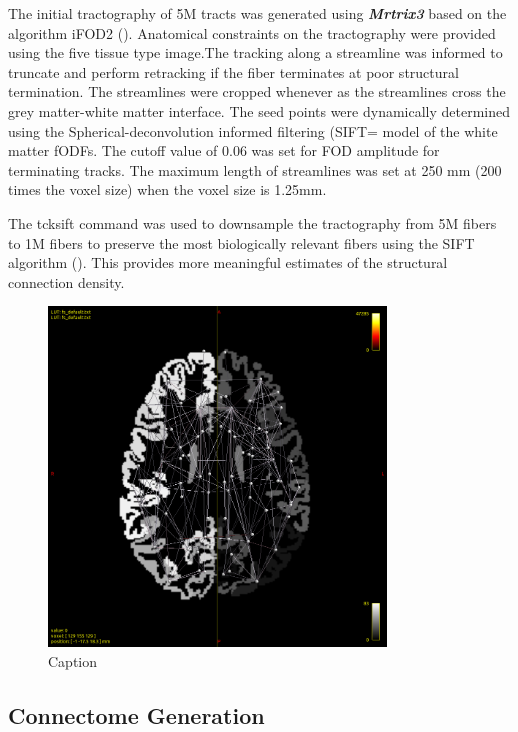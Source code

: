 \documentclass[msthesis.tex]{subfiles}
\begin{document}
The initial tractography of 5M tracts was generated using \textbf{\textit{Mrtrix3}} based on the algorithm iFOD2 (\cite{tournier2010improved}). Anatomical constraints on the tractography were provided using the five tissue type image.The tracking along a streamline was informed to truncate and perform retracking if the fiber terminates at poor structural termination. The streamlines were cropped whenever as the streamlines cross the grey matter-white matter interface. The seed points were dynamically determined using the Spherical-deconvolution informed filtering (SIFT= model \cite{smith2013sift} of the white matter fODFs. The cutoff value of 0.06 was set for FOD amplitude for terminating tracks. The maximum length of streamlines was set at 250 mm (200 times the voxel size) when the voxel size is 1.25mm.

The tcksift command was used to downsample the tractography from 5M fibers to 1M fibers to preserve the most biologically relevant fibers using the SIFT algorithm (\cite{smith2013sift}). This provides more meaningful estimates of the structural connection density.

\begin{figure}
    \centering
    \includegraphics[width=0.8\textwidth]{images/connectome.png}
    \caption{Caption}
    \label{fig:connectome_vis}
\end{figure}
\subsection{Connectome Generation}
\end{document}
